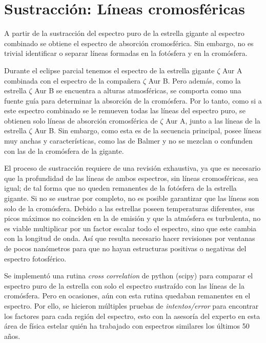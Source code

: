 \documentclass[12pt,oneside,openany,letter]{book}
\begin{document}
\section{Sustracción: Líneas cromosféricas}\label{sec:sustraccion}

A partir de la sustracción del espectro puro de la estrella gigante al espectro combinado se obtiene el espectro de absorción cromosférica. Sin embargo, no es trivial identificar o separar líneas formadas en la fotósfera y en la cromósfera.

Durante el eclipse parcial tenemos el espectro de la estrella gigante $\zeta$ Aur A combinada con el espectro de la compañera $\zeta$ Aur B. Pero además, como la estrella $\zeta$ Aur B se encuentra a alturas atmosféricas, se comporta como una fuente guía para determinar la absorción de la cromósfera. Por lo tanto, como si a este espectro combinado se le remueven todas las líneas del espectro puro,  se obtienen solo líneas de absorción cromosférica de $\zeta$ Aur A, junto a las líneas de la estrella $\zeta$ Aur B. Sin embargo, como esta es de la secuencia principal, posee líneas muy anchas y características, como las de Balmer y no se mezclan o confunden con las de la cromósfera de la gigante.

El proceso de sustracción requiere de una revisión exhaustiva, ya que es necesario que la profundidad de las líneas de ambos espectros, sin líneas cromosféricas, sea igual; de tal forma que no queden remanentes de la fotósfera de la estrella gigante. Si no se sustrae por completo, no es posible garantizar que las líneas son solo de la cromósfera. Debido a las estrellas poseen temperaturas diferentes, sus picos máximos no coinciden en la  de emisión y que la atmósfera es turbulenta, no es viable multiplicar por un factor escalar todo el espectro, sino que este cambia con la longitud de onda. Así que resulta necesario hacer revisiones por ventanas de pocos nanómetros para que no hayan estructuras positivas o negativas del espectro fotosférico.

Se implementó una rutina \textit{cross correlation} de python (scipy) para comparar el espectro puro de la estrella con solo el espectro sustraído con las líneas de la cromósfera. Pero en ocasiones, aún con esta rutina quedaban remanentes en el espectro. Por ello, se hicieron múltiples pruebas de \textit{intentos/error} para encontrar los factores para cada región del espectro, esto con la asesoría del experto en esta área de física estelar quién ha trabajado con espectros similares los últimos 50 años.
\end{document}
